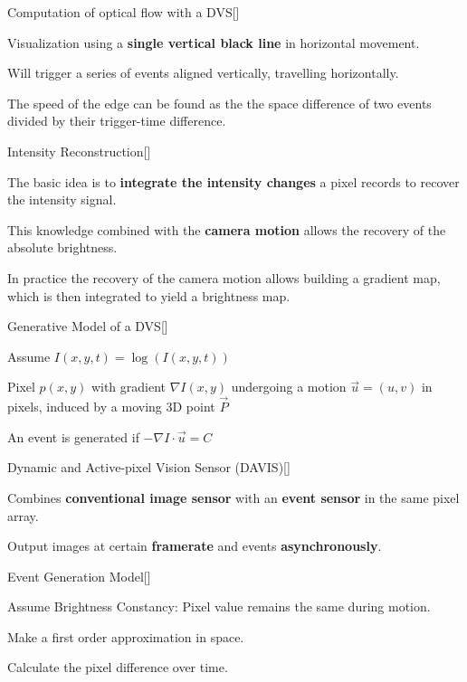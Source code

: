 \documentclass[10pt,a4paper]{scrartcl}
\begin{document}
\begin{multicols*}{2}
\begin{QandA}
{Computation of optical flow with a DVS}[\Application]
\item Visualization using a \textbf{single vertical black line} in horizontal movement.
\item Will trigger a series of events aligned vertically, travelling horizontally.
\item The speed of the edge can be found as the the space difference of two events divided by their trigger-time difference. 
\end{QandA}

\begin{QandA}
{Intensity Reconstruction}[\Application]
\item The basic idea is to \textbf{integrate the intensity changes} a pixel records to recover the intensity signal.
\item This knowledge combined with the \textbf{camera motion} allows the recovery of the absolute brightness.
\item In practice the recovery of the camera motion allows building a gradient map, which is then integrated to yield a brightness map.
\end{QandA}

\begin{QandA}
{Generative Model of a DVS}[\Definition]
\item Assume $I(x,y,t)=\log(I(x,y,t))$
\item Pixel $p(x,y)$ with gradient $\nabla I(x,y)$ undergoing a motion $\vec{u}=(u,v)$ in pixels, induced by a moving 3D point $\vec{P}$
\item An event is generated if $-\nabla I\cdot\vec{u}=C$
\end{QandA}

\begin{QandA}
{Dynamic and Active-pixel Vision Sensor (DAVIS)}[\Definition]
\item Combines \textbf{conventional image sensor} with an \textbf{event sensor} in the same pixel array.
\item Output images at certain \textbf{framerate} and events \textbf{asynchronously}.
\end{QandA}

\begin{QandA}
{Event Generation Model}[\Derivation]
\item Assume Brightness Constancy: Pixel value remains the same during motion.
\item Make a first order approximation in space.
\item Calculate the pixel difference over time.
\end{QandA}


\end{multicols*}
\end{document}
